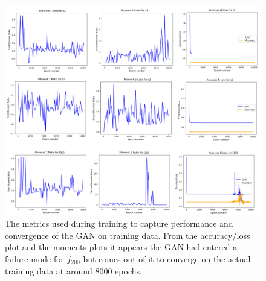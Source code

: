 \documentclass[11pt]{article} %
\begin{document}
\newpage
\null
\vfill
\begin{figure}[H]
\centering
\includegraphics[scale=0.3]{./images/working_metrics.jpeg}
\caption{The metrics used during training to capture performance and convergence
of the GAN on training data.
 From the accuracy/loss plot and the moments plots it appears the GAN had entered a failure mode for $f_{200}$ but
 comes out of it to converge on the actual training data at around 8000 epochs.}
\label{fig:ind_results_metrics}
\end{figure}
\null
\vfill
\newpage
\end{document}
